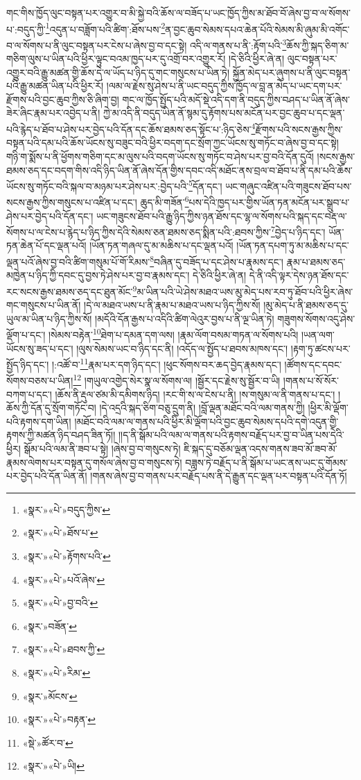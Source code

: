 གང་གིས་ཁྱོད་ལུང་བསྟན་པར་འགྱུར་བ་མི་སྐྱེ་བའི་ཆོས་ལ་བཟོད་པ་ཡང་ཁྱོད་ཀྱིས་མ་ཐོབ་བོ་ཞེས་བྱ་བ་ལ་སོགས་པ་:བདུད་ཀྱི་\footnote{«སྣར་»«པེ་»བདུད་ཀྱིས་}འདུན་པ་བཟློག་པའི་ཚིག་:ཐོས་པས་\footnote{«སྣར་»«པེ་»ཐོས་པ་}ན་བྱང་ཆུབ་སེམས་དཔའ་ཆེན་པོའི་སེམས་མི་ཞུམ་མི་འགོང་བ་ལ་སོགས་པ་ནི་ལུང་བསྟན་པར་ངེས་པ་ཞེས་བྱ་བ་དང་སྟེ། འདི་ལ་གནས་པ་ནི་:རྟོག་པའི་\footnote{«སྣར་»«པེ་»རྟོགས་པའི་}ཆོས་ཀྱི་སྐད་ཅིག་མ་གཅིག་ལུས་པ་ཡིན་པའི་ཕྱིར་ལྟུང་བའམ་ཁྱད་པར་དུ་འགྲོ་བར་འགྱུར་རོ། །དེ་ཅིའི་ཕྱིར་ཞེ་ན། ལུང་བསྟན་པར་འགྱུར་བའི་རྒྱུ་མཚན་གྱི་ཆོས་དེ་ལ་ཡོད་པ་ཉིད་དུ་གང་གསུངས་པ་ཡིན་ཏེ། སྐྱོན་མེད་པར་ཞུགས་པ་ནི་ལུང་བསྟན་པའི་རྒྱུ་མཚན་ཡིན་པའི་ཕྱིར་རོ། །ལམ་ལ་རྗེས་སུ་ཤེས་པ་ནི་ཡང་བདུད་ཀྱིས་ཁྱོད་ལ་བླ་ན་མེད་པ་ཡང་དག་པར་རྫོགས་པའི་བྱང་ཆུབ་ཀྱིས་ཅི་ཞིག་བྱ། གང་ལ་ཁྱོད་སྤྱོད་པའི་མདོ་སྡེ་འདི་དག་ནི་བདུད་ཀྱིས་བཤད་པ་ཡིན་ནོ་ཞེས་ཟེར་ཞིང་རྣམ་པར་འབྱེད་པ་ནི། ཀྱེ་མ་འདི་ནི་བདུད་ཡིན་ནོ་སྙམ་དུ་རྟོགས་པས་མངོན་པར་བྱང་ཆུབ་པ་དང་ལྡན་པའི་རྙེད་པ་ཐོབ་པ་ཤེས་པར་བྱེད་པའི་དོན་དང་ཆོས་ཐམས་ཅད་སྟོང་པ་:ཉིད་ཅེས་\footnote{«སྣར་»«པེ་»པའོ་ཞེས་}རྫོགས་པའི་སངས་རྒྱས་ཀྱིས་བསྟན་པའི་དམ་པའི་ཆོས་ཡོངས་སུ་བཟུང་བའི་ཕྱིར་བདག་དང་སྲོག་ཀྱང་ཡོངས་སུ་གཏོང་བ་ཞེས་བྱ་བ་དང་སྟེ། གཉི་ག་སྨོས་པ་ནི་ཕྱོགས་གཅིག་དང་མ་ལུས་པའི་བདག་ཡོངས་སུ་གཏོང་བ་ཤེས་པར་བྱ་བའི་དོན་དུའོ། །སངས་རྒྱས་ཐམས་ཅད་དང་བདག་གིས་འདི་ཉིད་ཡིན་ནོ་ཞེས་དོན་གྱིས་དབང་འདི་མཐོང་ནས་བྲལ་བ་ཐོབ་པ་ནི་དམ་པའི་ཆོས་ཡོངས་སུ་གཏོང་བའི་སྐལ་བ་མཉམ་པར་ཤེས་པར་:བྱེད་པའི་\footnote{«སྣར་»«པེ་»བྱ་བའི་}དོན་དང་། ཡང་གཞུང་འཛིན་པའི་གཟུངས་ཐོབ་པས་སངས་རྒྱས་ཀྱིས་གསུངས་པ་འཛིན་པ་དང་། ཆུད་མི་གཟོན་\footnote{«སྣར་»བཟོན་}པས་དེའི་ཁྱད་པར་གྱིས་ཡོན་ཏན་མངོན་པར་སྒྲུབ་པ་ཤེས་པར་བྱེད་པའི་དོན་དང་། ཡང་གཟུངས་ཐོབ་པའི་རྒྱུ་ཉིད་ཀྱིས་ཉན་ཐོས་དང་ལྷ་ལ་སོགས་པའི་སྐད་དང་བརྡ་ལ་སོགས་པ་ལ་ངེས་པ་རྙེད་པ་ཉིད་ཀྱིས་དེའི་སེམས་ཅན་ཐམས་ཅད་སྨིན་པའི་:ཐབས་ཀྱིས་\footnote{«སྣར་»«པེ་»ཐབས་ཀྱི་}བྱེད་པ་ཉིད་དང་། ཡོན་ཏན་ཆེན་པོ་དང་ལྡན་པའོ། །ཡོན་ཏན་གཞལ་དུ་མ་མཆིས་པ་དང་ལྡན་པའོ། །ཡོན་ཏན་དཔག་ཏུ་མ་མཆིས་པ་དང་ལྡན་པའོ་ཞེས་བྱ་བའི་ཚིག་གསུམ་པོ་གོ་རིམས་\footnote{«སྣར་»«པེ་»རིམ་}བཞིན་དུ་བཟོད་པ་དང་ཤེས་པ་རྣམས་དང་། རྣམ་པ་ཐམས་ཅད་མཁྱེན་པ་ཉིད་ཀྱི་དབང་དུ་བྱས་ཏེ་ཤེས་པར་བྱ་བ་རྣམས་དང་། དེ་ཅིའི་ཕྱིར་ཞེ་ན། དེ་ནི་འདི་ལྟར་དེས་ཉན་ཐོས་དང་རང་སངས་རྒྱས་ཐམས་ཅད་དང་ཐུན་མོང་\footnote{«སྣར་»མོངས་}མ་ཡིན་པའི་ཡེ་ཤེས་མཐའ་ཡས་མུ་མེད་པས་རབ་ཏུ་ཐོབ་པའི་ཕྱིར་ཞེས་གང་གསུངས་པ་ཡིན་ནོ། །དེ་ལ་མཐའ་ཡས་པ་ནི་རྣམ་པ་མཐའ་ཡས་པ་ཉིད་ཀྱིས་སོ། །མུ་མེད་པ་ནི་ཐམས་ཅད་དུ་ཡུལ་མ་ཡིན་པ་ཉིད་ཀྱིས་སོ། །མདོའི་དོན་རྒྱས་པ་འདིའི་ཚིག་ལེའུར་བྱས་པ་ནི་ལྔ་ཡིན་ཏེ། གཟུགས་སོགས་འདུ་ཤེས་ལྡོག་པ་དང་། །སེམས་བརྟེན་\footnote{«སྣར་»«པེ་»བརྟན་}ཐེག་པ་དམན་དག་ལས། །རྣམ་ལོག་བསམ་གཏན་ལ་སོགས་པའི། །ཡན་ལག་ཡོངས་སུ་ཟད་པ་དང་། །ལུས་སེམས་ཡང་བ་ཉིད་དང་ནི། །འདོད་ལ་སྤྱོད་པ་ཐབས་མཁས་དང་། །རྟག་ཏུ་ཚངས་པར་སྤྱོད་ཉིད་དང་། །:འཚོ་བ་\footnote{«སྡེ་»ཚོར་བ་}རྣམ་པར་དག་ཉིད་དང་། །ཕུང་སོགས་བར་ཆད་བྱེད་རྣམས་དང་། །ཚོགས་དང་དབང་སོགས་བཅས་པ་ཡིན།\footnote{«སྣར་»«པེ་»ཡི།} །གཡུལ་འགྱེད་སེར་སྣ་ལ་སོགས་ལ། །སྦྱོར་དང་རྗེས་སུ་སྦྱོར་བ་ཡི། །གནས་པ་སོ་སོར་བཀག་པ་དང་། །ཆོས་ནི་རྡུལ་ཙམ་མི་དམིགས་ཉིད། །རང་གི་ས་ལ་ངེས་པ་ནི། །ས་གསུམ་ལ་ནི་གནས་པ་དང་། །ཆོས་ཀྱི་དོན་དུ་སྲོག་གཏོང་བ། །དེ་འདྲའི་སྐད་ཅིག་བཅུ་དྲུག་ནི། །བློ་ལྡན་མཐོང་བའི་ལམ་གནས་ཀྱི། །ཕྱིར་མི་ལྡོག་པའི་རྟགས་དག་ཡིན། །མཐོང་བའི་ལམ་ལ་གནས་པའི་ཕྱིར་མི་ལྡོག་པའི་བྱང་ཆུབ་སེམས་དཔའི་དགེ་འདུན་གྱི་རྟགས་ཀྱི་མཚན་ཉིད་བཤད་ཟིན་ཏོ།། །།ད་ནི་སྒོམ་པའི་ལམ་ལ་གནས་པའི་རྟགས་བརྗོད་པར་བྱ་བ་ཡིན་པས་དེའི་ཕྱིར། སྒོམ་པའི་ལམ་ནི་ཟབ་པ་སྟེ། །ཞེས་བྱ་བ་གསུངས་ཏེ། ཇི་སྐད་དུ་བཅོམ་ལྡན་འདས་གནས་ཟབ་མོ་ཟབ་མོ་རྣམས་ལེགས་པར་བསྟན་དུ་གསོལ་ཞེས་བྱ་བ་གསུངས་ཏེ། བཟླས་ཏེ་བརྗོད་པ་ནི་སྒོམ་པ་ཡང་ནས་ཡང་དུ་གོམས་པར་བྱེད་པའི་དོན་ཡིན་ནོ། །གནས་ཞེས་བྱ་བ་གནས་པར་བརྗོད་པས་ནི་དེ་རྒྱུན་དང་ལྡན་པར་བསྟན་པའི་དོན་ཏོ། 